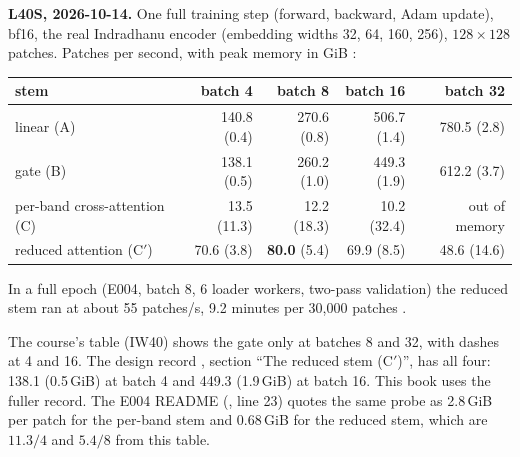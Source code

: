 \begin{drift}
\textbf{L40S, 2026-10-14.} One full training step (forward, backward, Adam update), bf16, the real Indradhanu encoder (embedding widths 32, 64, 160, 256), $128\times128$ patches. Patches per second, with peak memory in GiB :
\begin{center}
\begin{tabular}{lrrrr}\toprule
stem & batch 4 & batch 8 & batch 16 & batch 32\\\midrule
linear (A) & 140.8 (0.4) & 270.6 (0.8) & 506.7 (1.4) & 780.5 (2.8)\\
gate (B) & 138.1 (0.5) & 260.2 (1.0) & 449.3 (1.9) & 612.2 (3.7)\\
per-band cross-attention (C) & 13.5 (11.3) & 12.2 (18.3) & 10.2 (32.4) & out of memory\\
reduced attention (C$'$) & 70.6 (3.8) & \textbf{80.0} (5.4) & 69.9 (8.5) & 48.6 (14.6)\\\bottomrule
\end{tabular}
\end{center}
In a full epoch (E004, batch 8, 6 loader workers, two-pass validation) the reduced stem ran at about 55 patches/s, 9.2 minutes per 30,000 patches .
\end{drift}

\begin{sourcenote}
The course's table (IW40) shows the gate only at batches 8 and 32, with dashes at 4 and 16. The design record , section ``The reduced stem (C$'$)'', has all four: 138.1 (0.5\,GiB) at batch 4 and 449.3 (1.9\,GiB) at batch 16. This book uses the fuller record. The E004 README (, line 23) quotes the same probe as 2.8\,GiB per patch for the per-band stem and 0.68\,GiB for the reduced stem, which are $11.3/4$ and $5.4/8$ from this table.
\end{sourcenote}

